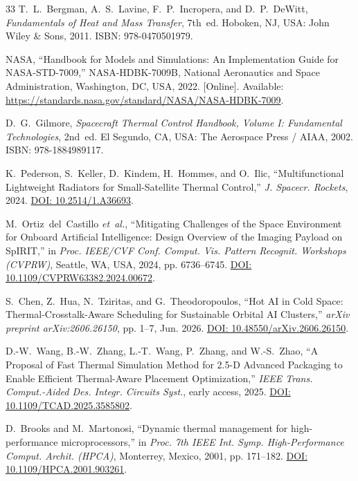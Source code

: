 \documentclass[journal]{IEEEtran}
\begin{document}
\begin{thebibliography}{33}
T.~L.~Bergman, A.~S.~Lavine, F.~P.~Incropera, and D.~P.~DeWitt, \emph{Fundamentals of Heat and Mass Transfer}, 7th~ed. Hoboken, NJ, USA: John Wiley \& Sons, 2011. ISBN: 978-0470501979.

NASA, ``Handbook for Models and Simulations: An Implementation Guide for NASA-STD-7009,'' NASA-HDBK-7009B, National Aeronautics and Space Administration, Washington, DC, USA, 2022. [Online]. Available: \url{https://standards.nasa.gov/standard/NASA/NASA-HDBK-7009}.

D.~G.~Gilmore, \emph{Spacecraft Thermal Control Handbook, Volume I: Fundamental Technologies}, 2nd~ed. El Segundo, CA, USA: The Aerospace Press / AIAA, 2002. ISBN: 978-1884989117.

K.~Pederson, S.~Keller, D.~Kindem, H.~Hommes, and O.~Ilic, ``Multifunctional Lightweight Radiators for Small-Satellite Thermal Control,'' \emph{J. Spacecr. Rockets}, 2024. \href{https://doi.org/10.2514/1.A36693}{DOI: 10.2514/1.A36693}.

M.~Ortiz~del~Castillo \emph{et~al.}, ``Mitigating Challenges of the Space Environment for Onboard Artificial Intelligence: Design Overview of the Imaging Payload on SpIRIT,'' in \emph{Proc. IEEE/CVF Conf. Comput. Vis. Pattern Recognit. Workshops (CVPRW)}, Seattle, WA, USA, 2024, pp. 6736--6745. \href{https://doi.org/10.1109/CVPRW63382.2024.00672}{DOI: 10.1109/CVPRW63382.2024.00672}.

S.~Chen, Z.~Hua, N.~Tziritas, and G.~Theodoropoulos, ``Hot AI in Cold Space: Thermal-Crosstalk-Aware Scheduling for Sustainable Orbital AI Clusters,'' \emph{arXiv preprint arXiv:2606.26150}, pp. 1--7, Jun. 2026. \href{https://doi.org/10.48550/arXiv.2606.26150}{DOI: 10.48550/arXiv.2606.26150}.

D.-W.~Wang, B.-W.~Zhang, L.-T.~Wang, P.~Zhang, and W.-S.~Zhao, ``A Proposal of Fast Thermal Simulation Method for 2.5-D Advanced Packaging to Enable Efficient Thermal-Aware Placement Optimization,'' \emph{IEEE Trans. Comput.-Aided Des. Integr. Circuits Syst.}, early access, 2025. \href{https://doi.org/10.1109/TCAD.2025.3585802}{DOI: 10.1109/TCAD.2025.3585802}.

D.~Brooks and M.~Martonosi, ``Dynamic thermal management for high-performance microprocessors,'' in \emph{Proc. 7th IEEE Int. Symp. High-Performance Comput. Archit. (HPCA)}, Monterrey, Mexico, 2001, pp. 171--182. \href{https://doi.org/10.1109/HPCA.2001.903261}{DOI: 10.1109/HPCA.2001.903261}.


\end{thebibliography}
\end{document}
